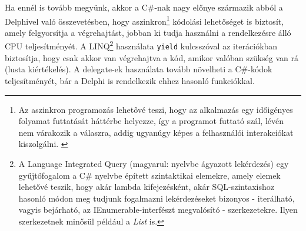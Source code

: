 \documentclass[tocnopagenum]{thesis-ekf}
\begin{document}
	Ha ennél is tovább megyünk, akkor a C\#-nak nagy előnye származik abból a Delphivel való összevetésben, hogy aszinkron\footnote{ Az aszinkron programozás lehetővé teszi, hogy az alkalmazás egy időigényes folyamat futtatását háttérbe helyezze, így a programot futtató szál, lévén nem várakozik a válaszra, addig ugyanúgy képes a felhasználói interakciókat kiszolgálni. \cite{async}} kódolási lehetőséget is biztosít, amely felgyorsítja a végrehajtást, jobban ki tudja használni a rendelkezésre álló CPU teljesítményét. A LINQ\footnote{A Language Integrated Query (magyarul: nyelvbe ágyazott lekérdezés) egy gyűjtőfogalom a C\# nyelvbe épített szintaktikai elemekre, amely elemek lehetővé teszik, hogy akár lambda kifejezésként, akár SQL-szintaxishoz hasonló módon meg tudjunk fogalmazni lekérdezéseket bizonyos - iterálható, vagyis bejárható, az IEnumerable-interfészt megvalósító - szerkezetekre. Ilyen szerkezetnek minősül például a \textit{List} is.} használata \verb|yield| kulcsszóval az iterációkban biztosítja, hogy csak akkor van végrehajtva a kód, amikor valóban szükség van rá (lusta kiértékelés). A delegate-ek használata tovább növelheti a C\#-kódok teljesítményét, bár a Delphi is rendelkezik ehhez hasonló funkciókkal.
	\cite{perf_comp}
	
\end{document}
